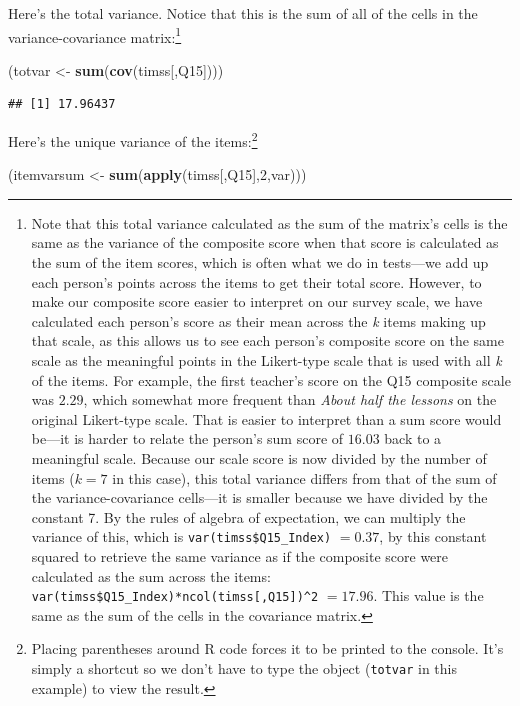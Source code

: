 \documentclass[
]{article}
\newenvironment{Shaded}{\begin{snugshade}}{\end{snugshade}}
\newcommand{\DecValTok}[1]{\textcolor[rgb]{0.00,0.00,0.81}{#1}}
\newcommand{\KeywordTok}[1]{\textcolor[rgb]{0.13,0.29,0.53}{\textbf{#1}}}
\newcommand{\NormalTok}[1]{#1}
\newcommand{\StringTok}[1]{\textcolor[rgb]{0.31,0.60,0.02}{#1}}
\begin{document}
Here's the total variance. Notice that this is the sum of all of the cells in the variance-covariance matrix:\footnote{Note that this total variance calculated as the sum of the matrix's cells is the same as the variance of the composite score when that score is calculated as the sum of the item scores, which is often what we do in tests---we add up each person's points across the items to get their total score. However, to make our composite score easier to interpret on our survey scale, we have calculated each person's score as their mean across the \emph{k} items making up that scale, as this allows us to see each person's composite score on the same scale as the meaningful points in the Likert-type scale that is used with all \emph{k} of the items. For example, the first teacher's score on the Q15 composite scale was \(2.29\), which somewhat more frequent than \emph{About half the lessons} on the original Likert-type scale. That is easier to interpret than a sum score would be---it is harder to relate the person's sum score of \(16.03\) back to a meaningful scale. Because our scale score is now divided by the number of items (\(k = 7\) in this case), this total variance differs from that of the sum of the variance-covariance cells---it is smaller because we have divided by the constant 7. By the rules of algebra of expectation, we can multiply the variance of this, which is \texttt{var(timss\$Q15\_Index)} \(= 0.37\), by this constant squared to retrieve the same variance as if the composite score were calculated as the sum across the items: \texttt{var(timss\$Q15\_Index)*ncol(timss{[},Q15{]})\^{}2} \(=17.96\). This value is the same as the sum of the cells in the covariance matrix.}

\begin{Shaded}
\begin{Highlighting}[]
\NormalTok{(totvar <-}\StringTok{ }\KeywordTok{sum}\NormalTok{(}\KeywordTok{cov}\NormalTok{(timss[,Q15])))}
\end{Highlighting}
\end{Shaded}

\begin{verbatim}
## [1] 17.96437
\end{verbatim}

Here's the unique variance of the items:\footnote{Placing parentheses around R code forces it to be printed to the console. It's simply a shortcut so we don't have to type the object (\texttt{totvar} in this example) to view the result.}

\begin{Shaded}
\begin{Highlighting}[]
\NormalTok{(itemvarsum <-}\StringTok{ }\KeywordTok{sum}\NormalTok{(}\KeywordTok{apply}\NormalTok{(timss[,Q15],}\DecValTok{2}\NormalTok{,var)))}
\end{Highlighting}
\end{Shaded}
\end{document}
